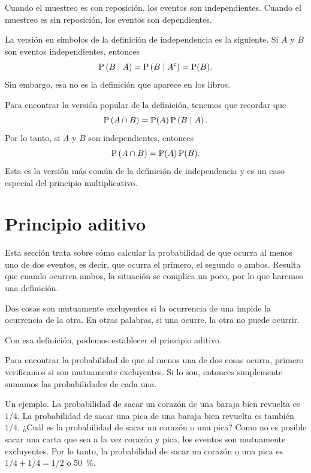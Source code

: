 \begin{remark}
	Cuando el muestreo es con reposición, los eventos son independientes. Cuando el muestreo es sin reposición, los eventos son dependientes.
\end{remark}

\formal
La versión en símbolos de la definición de independencia es la siguiente. Si \(A\) y \(B\) son eventos independientes, entonces \[\operatorname{P}\left(B\;\middle|\;A\right) = \operatorname{P}\left(B\;\middle|\;{A}^{\mathsf{c}}\right)= \operatorname{P}(B).\] Sin embargo, esa no es la definición que aparece en los libros. 

Para encontrar la versión popular de la definición, tenemos que recordar que \[\operatorname{P}\left(A \cap B\right) = \operatorname{P}(A)  \operatorname{P}\left(B\;\middle|\;A\right).\] Por lo tanto, si \(A\) y \(B\) son independientes, entonces \[\operatorname{P}\left(A \cap B\right) = \operatorname{P}(A)  \operatorname{P}(B).\] Esta es la versión más común de la definición de independencia y es un caso especial del principio multiplicativo.

\informal
\section{Principio aditivo}

Esta sección trata sobre cómo calcular la probabilidad de que ocurra al menos uno de dos eventos, es decir, que ocurra el primero, el segundo o ambos. Resulta que cuando ocurren ambos, la situación se complica un poco, por lo que haremos una definición.

\begin{definition}

Dos cosas son mutuamente excluyentes si la ocurrencia de una impide la ocurrencia de la otra. En otras palabras, si una ocurre, la otra no puede ocurrir.
\end{definition}

Con esa definición, podemos establecer el principio aditivo.
\begin{definition}
Para encontrar la probabilidad de que al menos una de dos cosas ocurra, primero verificamos si son mutuamente excluyentes. Si lo son, entonces simplemente sumamos las probabilidades de cada una.
\end{definition}

Un ejemplo. La probabilidad de sacar un corazón de una baraja bien revuelta es \(1/4\). La probabilidad de sacar una pica de una baraja bien revuelta es también \(1/4\). ¿Cuál es la probabilidad de sacar un corazón o una pica? Como no es posible sacar una carta que sea a la vez corazón y pica, los eventos son mutuamente excluyentes. Por lo tanto, la probabilidad de sacar un corazón o una pica es \(1/4 + 1/4 = 1/2\) o \qty{50}{\percent}.

